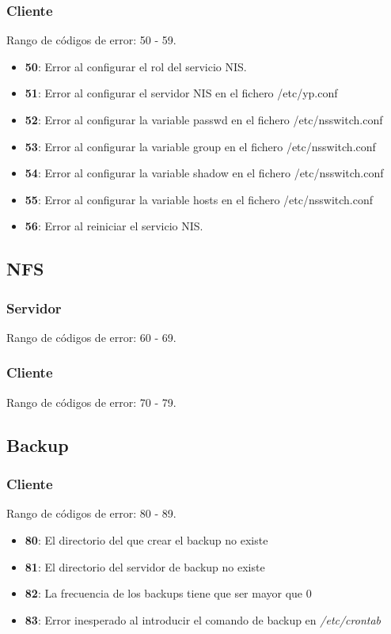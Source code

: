 \documentclass[12pt,a4paper, spanish]{article}
\begin{document}
\subsubsection{Cliente}
Rango de códigos de error: 50 - 59.
\begin{itemize}
  \item \textbf{50}: Error al configurar el rol del servicio NIS.
  \item \textbf{51}: Error al configurar el servidor NIS en el fichero /etc/yp.conf
  \item \textbf{52}: Error al configurar la variable passwd en el fichero /etc/nsswitch.conf
  \item \textbf{53}: Error al configurar la variable group en el fichero /etc/nsswitch.conf
  \item \textbf{54}: Error al configurar la variable shadow en el fichero /etc/nsswitch.conf
  \item \textbf{55}: Error al configurar la variable hosts en el fichero /etc/nsswitch.conf
  \item \textbf{56}: Error al reiniciar el servicio NIS.
\end{itemize}

\subsection{NFS}

\subsubsection{Servidor}
Rango de códigos de error: 60 - 69.

\subsubsection{Cliente}
Rango de códigos de error: 70 - 79.

\subsection{Backup}

\subsubsection{Cliente}
Rango de códigos de error: 80 - 89.
\begin{itemize}
  \item \textbf{80}: El directorio del que crear el backup no existe 
  \item \textbf{81}: El directorio del servidor de backup no existe
  \item \textbf{82}: La frecuencia de los backups tiene que ser mayor que 0
  \item \textbf{83}: Error inesperado al introducir el comando de backup en \textit{/etc/crontab}
\end{itemize}
\end{document}
